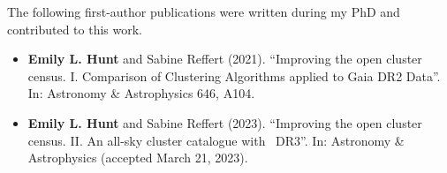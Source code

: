%

{}

The following first-author publications were written during my PhD and contributed to this work. 

\begin{itemize}
    \item \textbf{Emily L. Hunt} and Sabine Reffert (2021). ``Improving the open cluster census. I. Comparison of Clustering Algorithms applied to Gaia DR2 Data''. In: Astronomy \& Astrophysics 646, A104.
    \item \textbf{Emily L. Hunt} and Sabine Reffert (2023). ``Improving the open cluster census. II. An all-sky cluster catalogue with \gaia\ DR3''. In: Astronomy \& Astrophysics (accepted March 21\first, 2023).
\end{itemize}
